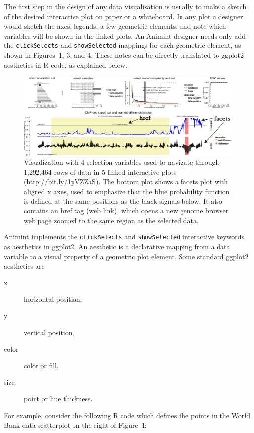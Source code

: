 \documentclass[10pt,journal,compsoc]{IEEEtran}\usepackage[]{graphicx}\usepackage[]{color}
\begin{document}
The first step in the design of any data visualization
is usually to make a sketch
of the desired interactive plot on paper or a whiteboard.
In any plot a designer would sketch
the axes, legends, a few geometric elements, and note which variables
will be shown in the linked plots. An Animint designer needs only add
the \texttt{clickSelects} and
\mbox{\texttt{showSelected}} mappings for each geometric element, as shown in
Figures~1, 3, and 4. These notes can be directly translated to
ggplot2 aesthetics in R code, as explained below.

\begin{figure}[b!]
  \centering
  \includegraphics[width=\textwidth]{figure-chip-seq}
  \caption{Visualization with 4 selection variables used to navigate
    through 1,292,464 rows of data in 5 linked interactive plots
    (\url{http://bit.ly/1pVZZaS}). The bottom plot shows a
    facets plot with aligned x axes, used to emphasize that the
    blue probability function is defined at the same positions as the
    black signals below. It also contains an href tag (web link), which opens a
    new genome browser web page zoomed to the same region as the
    selected data.}
  \label{fig:ChIPseq}
\end{figure}

Animint implements the \texttt{clickSelects} and \texttt{showSelected}
interactive keywords as aesthetics in ggplot2. An aesthetic is a
declarative mapping from a data variable to a visual property of a
geometric plot element. Some standard ggplot2 aesthetics are
\begin{description}
\item[x] horizontal position,
\item[y] vertical position,
\item[color] color or fill,
\item[size] point or line thickness.
\end{description}

For example, consider the following R code which defines the points in the
World Bank data scatterplot on the right of Figure~1:
\end{document}
